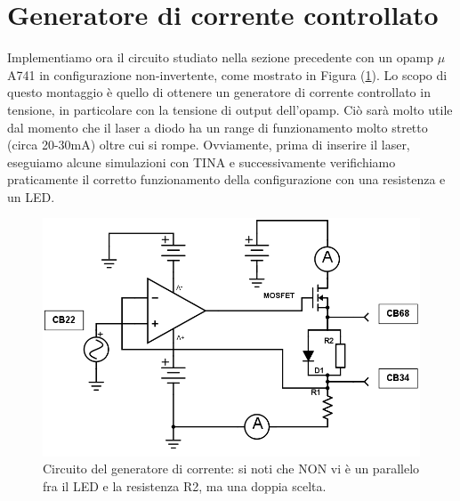 \documentclass[journal, a4paper]{IEEEtran}
\begin{document}
\section{Generatore di corrente controllato}

Implementiamo ora il circuito studiato nella sezione precedente con un opamp $\mu $A741 in configurazione non-invertente, come mostrato in Figura (\ref{fig:WEEK08-ES12}). Lo scopo di questo montaggio è quello di ottenere un generatore di corrente controllato in tensione, in particolare con la tensione di output dell'opamp. Ciò sarà molto utile dal momento che il laser a diodo ha un range di funzionamento molto stretto (circa 20-30mA) oltre cui si rompe. Ovviamente, prima di inserire il laser, eseguiamo alcune simulazioni con TINA e successivamente verifichiamo praticamente il corretto funzionamento della configurazione con una resistenza e un LED.\\

\begin{figure}
\centering
\includegraphics[width=0.7\linewidth]{./WEEK08-ES12}
\caption{Circuito del generatore di corrente: si noti che NON vi è un parallelo fra il LED e la resistenza R2, ma una doppia scelta.}
\label{fig:WEEK08-ES12}
\end{figure}
\end{document}
